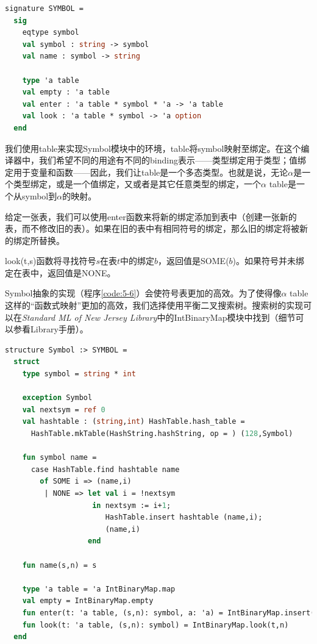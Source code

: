 \documentclass[cn,11pt,chinese]{elegantbook}
\begin{document}
\begin{lstlisting}[language=ml,caption={SYMBOL的签名},label={code:5-5}]
  signature SYMBOL =
  sig
    eqtype symbol
    val symbol : string -> symbol
    val name : symbol -> string

    type 'a table
    val empty : 'a table
    val enter : 'a table * symbol * 'a -> 'a table
    val look : 'a table * symbol -> 'a option
  end
\end{lstlisting}

我们使用table来实现Symbol模块中的环境，table将symbol映射至绑定。在这个编译器中，我们希望不同的用途有不同的binding表示——类型绑定用于类型；值绑定用于变量和函数——因此，我们让table是一个多态类型。也就是说，无论$\alpha$是一个类型绑定，或是一个值绑定，又或者是其它任意类型的绑定，一个$\alpha$ table是一个从symbol到$\alpha$的映射。

给定一张表，我们可以使用enter函数来将新的绑定添加到表中（创建一张新的表，而不修改旧的表）。如果在旧的表中有相同符号的绑定，那么旧的绑定将被新的绑定所替换。

look(t,s)函数将寻找符号$s$在表$t$中的绑定$b$，返回值是SOME($b$)。如果符号并未绑定在表中，返回值是NONE。

Symbol抽象的实现（程序\ref{code:5-6}）会使符号表更加的高效。为了使得像$\alpha$ table这样的“函数式映射”更加的高效，我们选择使用平衡二叉搜索树。搜索树的实现可以在\textit{Standard ML of New Jersey Library}中的IntBinaryMap模块中找到（细节可以参看Library手册）。

\begin{lstlisting}[language=ml,caption={符号表的实现。HashTable和IntBinaryMap来自\textit{Standard ML of New Jersey Library}},label={code:5-6}]
  structure Symbol :> SYMBOL =
  struct
    type symbol = string * int

    exception Symbol
    val nextsym = ref 0
    val hashtable : (string,int) HashTable.hash_table =
      HashTable.mkTable(HashString.hashString, op = ) (128,Symbol)

    fun symbol name =
      case HashTable.find hashtable name
        of SOME i => (name,i)
         | NONE => let val i = !nextsym
                    in nextsym := i+1;
                       HashTable.insert hashtable (name,i);
                       (name,i)
                   end

    fun name(s,n) = s

    type 'a table = 'a IntBinaryMap.map
    val empty = IntBinaryMap.empty
    fun enter(t: 'a table, (s,n): symbol, a: 'a) = IntBinaryMap.insert(t,n,a)
    fun look(t: 'a table, (s,n): symbol) = IntBinaryMap.look(t,n)
  end
\end{lstlisting}
\end{document}
